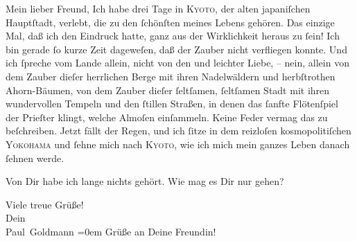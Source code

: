 \pstart\center{}Mein lieber Freund,\pend\vspace{0.5em}
\pstart
           Ich habe drei Tage in \textsc{Kyoto}, der alten japaniſchen Hauptſtadt, verlebt, die zu den ſchönſten
               meines Lebens gehören. Das einzige Mal, daß ich den Eindruck hatte, ganz aus der
               Wirklichkeit heraus zu ſein! Ich bin gerade ſo kurze Zeit dageweſen, daß der Zauber
               nicht verfliegen konnte. Und ich ſpreche vom Lande allein,  nicht von den \label{K_L02864-1v}\label{K_L02864-1} und leichter Liebe, – nein, allein von dem Zauber dieſer
               herrlichen Berge mit ihren Nadelwäldern und herbſtrothen Ahorn-Bäumen, von dem {\pb}Zauber dieſer ſeltſamen, ſeltſamen Stadt mit ihren wundervollen  Tempeln und den ſtillen Straßen, in denen
               das ſanfte Flötenſpiel der Prieſter klingt, welche Almoſen einſammeln. Keine Feder
               vermag das zu beſchreiben. Jetzt fällt der Regen, und ich ſitze in dem reizloſen
               kosmopolitiſchen \textsc{Yokohama} und ſehne mich nach \textsc{Kyoto}, wie ich mich mein ganzes Leben danach ſehnen werde.\pend
           
\pstart
           Von Dir habe ich lange nichts gehört. Wie mag es Dir nur gehen?\pend
           
\pstart
           Viele treue Grüße! {\\[\baselineskip]}Dein {\\[\baselineskip]}\spacefill\mbox{Paul Goldmann}\pend
           \leftskip=0em{}
\pstart
           \noindent{}Grüße an Deine Freundin!\pend
           \endnumbering{}  
      